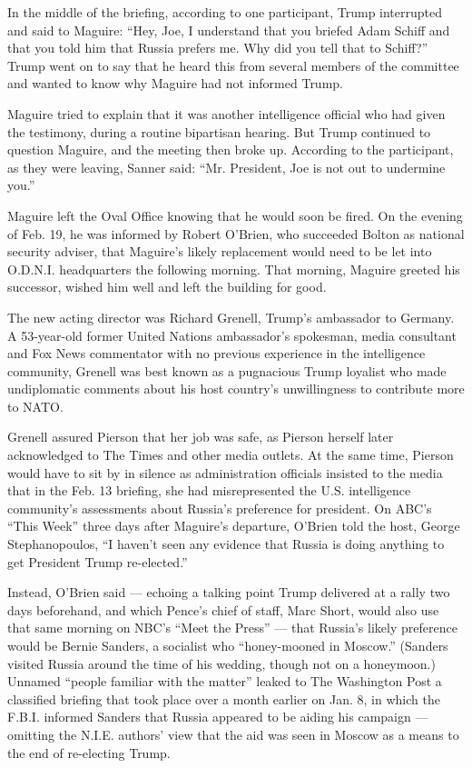 In the middle of the briefing, according to one participant, Trump
interrupted and said to Maguire: ``Hey, Joe, I understand that you
briefed Adam Schiff and that you told him that Russia prefers me. Why
did you tell that to Schiff?'' Trump went on to say that he heard this
from several members of the committee and wanted to know why Maguire had
not informed Trump.

Maguire tried to explain that it was another intelligence official who
had given the testimony, during a routine bipartisan hearing. But Trump
continued to question Maguire, and the meeting then broke up. According
to the participant, as they were leaving, Sanner said: ``Mr. President,
Joe is not out to undermine you.''

Maguire left the Oval Office knowing that he would soon be fired. On the
evening of Feb. 19, he was informed by Robert O'Brien, who succeeded
Bolton as national security adviser, that Maguire's likely replacement
would need to be let into O.D.N.I. headquarters the following morning.
That morning, Maguire greeted his successor, wished him well and left
the building for good.

The new acting director was Richard Grenell, Trump's ambassador to
Germany. A 53-year-old former United Nations ambassador's spokesman,
media consultant and Fox News commentator with no previous experience in
the intelligence community, Grenell was best known as a pugnacious Trump
loyalist who made undiplomatic comments about his host country's
unwillingness to contribute more to NATO.

Grenell assured Pierson that her job was safe, as Pierson herself later
acknowledged to The Times and other media outlets. At the same time,
Pierson would have to sit by in silence as administration officials
insisted to the media that in the Feb. 13 briefing, she had
misrepresented the U.S. intelligence community's assessments about
Russia's preference for president. On ABC's ``This Week'' three days
after Maguire's departure, O'Brien told the host, George Stephanopoulos,
``I haven't seen any evidence that Russia is doing anything to get
President Trump re-elected.''

Instead, O'Brien said --- echoing a talking point Trump delivered at a
rally two days beforehand, and which Pence's chief of staff, Marc Short,
would also use that same morning on NBC's ``Meet the Press'' --- that
Russia's likely preference would be Bernie Sanders, a socialist who
``honey-mooned in Moscow.'' (Sanders visited Russia around the time of
his wedding, though not on a honeymoon.) Unnamed ``people familiar with
the matter'' leaked to The Washington Post a classified briefing that
took place over a month earlier on Jan. 8, in which the F.B.I. informed
Sanders that Russia appeared to be aiding his campaign --- omitting the
N.I.E. authors' view that the aid was seen in Moscow as a means to the
end of re-electing Trump.

